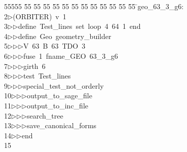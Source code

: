 %
%
\begin{tabbing}
55555 \= 55 \= 55 \= 55 \= 55 \= 55 \= 55 \= 55 \= 55 \= 55 \= 55 \= 55 \= 55 \= \>geo\_63\_3\_g6:\\[0pt]
2\>$\triangleright$\>(ORBITER)\ v\ 1\ \\[0pt]
3\>$\triangleright$\>$\triangleright$\>define\ Test\_lines\ set\ loop\ 4\ 64\ 1\ end\ \\[0pt]
4\>$\triangleright$\>$\triangleright$\>define\ Geo\ geometry\_builder\ \\[0pt]
5\>$\triangleright$\>$\triangleright$\>$\triangleright$\>V\ 63\ B\ 63\ TDO\ 3\ \\[0pt]
6\>$\triangleright$\>$\triangleright$\>$\triangleright$\>fuse\ 1\ fname\_GEO\ 63\_3\_g6\ \\[0pt]
7\>$\triangleright$\>$\triangleright$\>$\triangleright$\>girth\ 6\ \\[0pt]
8\>$\triangleright$\>$\triangleright$\>$\triangleright$\>test\ Test\_lines\ \\[0pt]
9\>$\triangleright$\>$\triangleright$\>$\triangleright$\>special\_test\_not\_orderly\ \\[0pt]
10\>$\triangleright$\>$\triangleright$\>$\triangleright$\>output\_to\_sage\_file\ \\[0pt]
11\>$\triangleright$\>$\triangleright$\>$\triangleright$\>output\_to\_inc\_file\ \\[0pt]
12\>$\triangleright$\>$\triangleright$\>$\triangleright$\>search\_tree\ \\[0pt]
13\>$\triangleright$\>$\triangleright$\>$\triangleright$\>save\_canonical\_forms\ \\[0pt]
14\>$\triangleright$\>$\triangleright$\>end\\[0pt]
15\>\end{tabbing}
